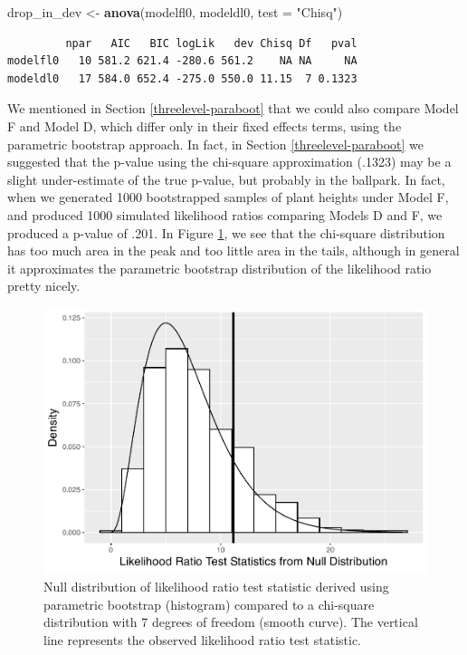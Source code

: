 \documentclass[
]{krantz}
\newenvironment{Shaded}{\begin{snugshade}}{\end{snugshade}}
\newcommand{\DataTypeTok}[1]{\textcolor[rgb]{0.27,0.27,0.27}{#1}}
\newcommand{\KeywordTok}[1]{\textcolor[rgb]{0.27,0.27,0.27}{\textbf{#1}}}
\newcommand{\NormalTok}[1]{#1}
\newcommand{\StringTok}[1]{\textcolor[rgb]{0.5,0.5,0.5}{#1}}
\begin{document}
\begin{Shaded}
\begin{Highlighting}[]
\NormalTok{drop_in_dev <-}\StringTok{ }\KeywordTok{anova}\NormalTok{(modelfl0, modeldl0, }\DataTypeTok{test =} \StringTok{"Chisq"}\NormalTok{)}
\end{Highlighting}
\end{Shaded}

\begin{verbatim}
         npar   AIC   BIC logLik   dev Chisq Df   pval
modelfl0   10 581.2 621.4 -280.6 561.2    NA NA     NA
modeldl0   17 584.0 652.4 -275.0 550.0 11.15  7 0.1323
\end{verbatim}

We mentioned in Section \ref{threelevel-paraboot} that we could also compare Model F and Model D, which differ only in their fixed effects terms, using the parametric bootstrap approach. In fact, in Section \ref{threelevel-paraboot} we suggested that the p-value using the chi-square approximation (.1323) may be a slight under-estimate of the true p-value, but probably in the ballpark. In fact, when we generated 1000 bootstrapped samples of plant heights under Model F, and produced 1000 simulated likelihood ratios comparing Models D and F, we produced a p-value of .201. In Figure \ref{fig:parabootDF}, we see that the chi-square distribution has too much area in the peak and too little area in the tails, although in general it approximates the parametric bootstrap distribution of the likelihood ratio pretty nicely.

\begin{figure}

{\centering \includegraphics[width=0.6\linewidth]{bookdown-BeyondMLR_files/figure-latex/parabootDF-1} 

}

\caption{Null distribution of likelihood ratio test statistic derived using parametric bootstrap (histogram) compared to a chi-square distribution with 7 degrees of freedom (smooth curve).  The vertical line represents the observed likelihood ratio test statistic.}\label{fig:parabootDF}
\end{figure}
\end{document}

